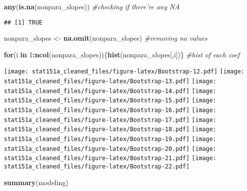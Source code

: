 \documentclass[
]{article}
\newenvironment{Shaded}{\begin{snugshade}}{\end{snugshade}}
\newcommand{\CommentTok}[1]{\textcolor[rgb]{0.56,0.35,0.01}{\textit{#1}}}
\newcommand{\ControlFlowTok}[1]{\textcolor[rgb]{0.13,0.29,0.53}{\textbf{#1}}}
\newcommand{\DecValTok}[1]{\textcolor[rgb]{0.00,0.00,0.81}{#1}}
\newcommand{\KeywordTok}[1]{\textcolor[rgb]{0.13,0.29,0.53}{\textbf{#1}}}
\newcommand{\NormalTok}[1]{#1}
\newcommand{\OperatorTok}[1]{\textcolor[rgb]{0.81,0.36,0.00}{\textbf{#1}}}
\newcommand{\StringTok}[1]{\textcolor[rgb]{0.31,0.60,0.02}{#1}}
\begin{document}
\begin{Shaded}
\begin{Highlighting}[]
\KeywordTok{any}\NormalTok{(}\KeywordTok{is.na}\NormalTok{(nonpara_slopes)) }\CommentTok{#checking if there're any NA}
\end{Highlighting}
\end{Shaded}

\begin{verbatim}
## [1] TRUE
\end{verbatim}

\begin{Shaded}
\begin{Highlighting}[]
\NormalTok{nonpara_slopes <-}\StringTok{ }\KeywordTok{na.omit}\NormalTok{(nonpara_slopes) }\CommentTok{#removing na values}


\ControlFlowTok{for}\NormalTok{(i }\ControlFlowTok{in} \DecValTok{1}\OperatorTok{:}\KeywordTok{ncol}\NormalTok{(nonpara_slopes))\{}\KeywordTok{hist}\NormalTok{(nonpara_slopes[,i])\} }\CommentTok{#hist of each coef}
\end{Highlighting}
\end{Shaded}

\texttt{[image: stat151a\_cleaned\_files/figure-latex/Bootstrap-12.pdf]}
\texttt{[image: stat151a\_cleaned\_files/figure-latex/Bootstrap-13.pdf]}
\texttt{[image: stat151a\_cleaned\_files/figure-latex/Bootstrap-14.pdf]}
\texttt{[image: stat151a\_cleaned\_files/figure-latex/Bootstrap-15.pdf]}
\texttt{[image: stat151a\_cleaned\_files/figure-latex/Bootstrap-16.pdf]}
\texttt{[image: stat151a\_cleaned\_files/figure-latex/Bootstrap-17.pdf]}
\texttt{[image: stat151a\_cleaned\_files/figure-latex/Bootstrap-18.pdf]}
\texttt{[image: stat151a\_cleaned\_files/figure-latex/Bootstrap-19.pdf]}
\texttt{[image: stat151a\_cleaned\_files/figure-latex/Bootstrap-20.pdf]}
\texttt{[image: stat151a\_cleaned\_files/figure-latex/Bootstrap-21.pdf]}
\texttt{[image: stat151a\_cleaned\_files/figure-latex/Bootstrap-22.pdf]}

\begin{Shaded}
\begin{Highlighting}[]
\KeywordTok{summary}\NormalTok{(modeling)}
\end{Highlighting}
\end{Shaded}
\end{document}
